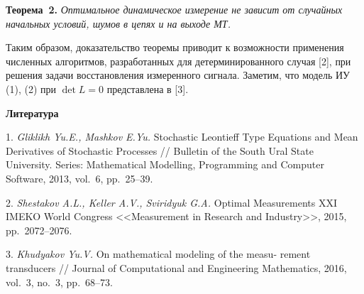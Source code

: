 \textbf{Теорема~2.} {\it
Оптимальное динамическое измерение не зависит от случайных начальных условий, шумов в цепях и на выходе МТ.	
	}
	
Таким образом, доказательство теоремы приводит к возможности применения численных алгоритмов, разработанных для детерминированного случая [2], при решения задачи восстановления измеренного сигнала. Заметим, что модель ИУ (1), (2) при $\det L=0$ представлена в [3].


\smallskip \centerline {\bf Литература} \nopagebreak

1. {\it Gliklikh Yu.E., Mashkov E.Yu.} Stochastic Leontieff Type Equations and Mean Derivatives of Stochastic Processes // Bulletin of the South Ural State University. Series: Mathematical Modelling, Programming and Computer Software, 2013, vol.~6, pp.~25--39.

2. {\it Shestakov A.L., Keller A.V., Sviridyuk G.A.} Optimal Measurements XXI IMEKO World Congress <<Measurement in Research and Industry>>, 2015, pp.~2072--2076.

3. {\it Khudyakov Yu.V.} On mathematical modeling of the measu- \- rement transducers
// Journal of Computational and Engineering Mathematics, 2016, vol.~3, no.~3, pp.~68--73.
